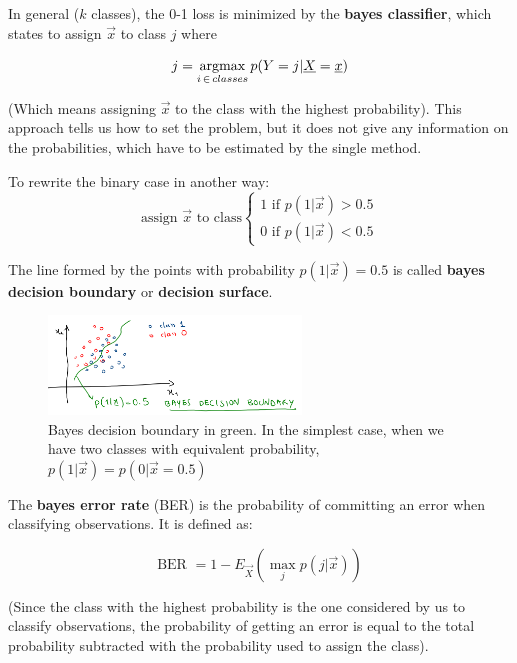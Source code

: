     In general ($k$ classes), the 0-1 loss is minimized by the \textbf{bayes
    classifier}, which states to assign $\vec{x}$ to class $j$ where 

    $$j = \operatorname*{argmax}_{i\,\in\,classes} p(Y = j|\underline{X} = \underline{x})$$

    (Which means assigning $\vec{x}$ to the class with the highest probability).
    This approach tells us how to set the problem, but it does not give any
    information on the probabilities, which have to be estimated by the single
    method.

    To rewrite the binary case in another way:
    $$
    \text{assign } \vec{x} \text{ to class} 
    \begin{cases}
      1 \text{ if } p(1|\vec{x}) > 0.5\\
      0 \text{ if } p(1|\vec{x}) < 0.5
    \end{cases}
    $$
    
    The line formed by the points with probability $p(1|\vec{x}) = 0.5$ is
    called \textbf{bayes decision boundary} or \textbf{decision surface}.
    
\begin{figure}[ht]
\centering
\caption{Bayes decision boundary in green. In the simplest case, when we have two classes with equivalent
probability, $ p(1 | \vec{x}) = p(0 | \vec{x} = 0.5 )$}
\includegraphics[width=0.6\textwidth]{BayesDecisionBoundary}
\end{figure}

    The \textbf{bayes error rate} (BER) is the probability of committing an
    error when classifying observations. It is defined as:
    
    $$\text{BER } = 1 - E_{\vec{X}}\left(\max_{j} p(j|\vec{x})\right)$$
    
(Since the class with the highest probability is the one considered by us to
classify observations, the probability of getting an error is equal to the total
probability subtracted with the probability used to assign the class).

